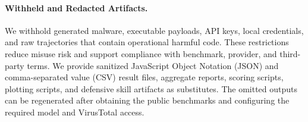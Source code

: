 \paragraph{Withheld and Redacted Artifacts.}
We withhold generated malware, executable payloads, API keys, local credentials, and raw trajectories that contain operational harmful code. These restrictions reduce misuse risk and support compliance with benchmark, provider, and third-party terms. We provide sanitized JavaScript Object Notation (JSON) and comma-separated value (CSV) result files, aggregate reports, scoring scripts, plotting scripts, and defensive skill artifacts as substitutes. The omitted outputs can be regenerated after obtaining the public benchmarks and configuring the required model and VirusTotal access.
